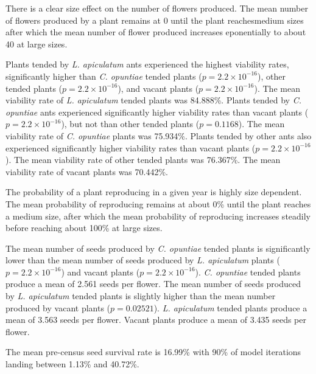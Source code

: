 \documentclass[11pt]{article}
\begin{document}
There is a clear size effect on the number of flowers produced. 
The mean number of flowers produced by a plant remains at 0 until the plant reachesmedium sizes after which the mean number of flower produced increases eponentially to about 40 at large sizes.


Plants tended by \textit{L. apiculatum} ants experienced the highest viability rates, significantly higher than \textit{C. opuntiae} tended plants ($p = 2.2 \times 10^{-16}$), other tended plants ($p = 2.2 \times 10^{-16}$), and vacant plants ($p = 2.2 \times 10^{-16}$).
The mean viability rate of \textit{L. apiculatum} tended plants was 84.888\%.
Plants tended by \textit{C. opuntiae} ants experienced significantly higher viability rates than vacant plants ($p = 2.2 \times 10^{-16}$), but not than other tended plants ($p = 0.1168$).
The mean viability rate of \textit{C. opuntiae} plants was 75.934\%.
Plants tended by other ants also experienced significantly higher viability rates than vacant plants ($p = 2.2 \times 10^{-16}$).
The mean viability rate of other tended plants was 76.367\%.
The mean viability rate of vacant plants was 70.442\%.

The probability of a plant reproducing in a given year is highly size dependent. 
The mean probability of reproducing remains at about 0\% until the plant reaches a medium size, after which the mean probability of reproducing increases steadily before reaching about 100\% at large sizes. 

The mean number of seeds produced by \textit{C. opuntiae} tended plants is significantly lower than the mean number of seeds produced by \textit{L. apiculatum} plants ($p = 2.2 \times 10^{-16}$) and vacant plants ($p = 2.2 \times 10^{-16}$). 
\textit{C. opuntiae} tended plants produce a mean of 2.561 seeds per flower. 
The mean number of seeds produced by \textit{L. apiculatum} tended plants is slightly higher than the mean number produced by vacant plants ($p = 0.02521$). 
\textit{L. apiculatum} tended plants produce a mean of 3.563 seeds per flower. 
Vacant plants produce a mean of 3.435 seeds per flower. 

The mean pre-census seed survival rate is 16.99\% with 90\% of model iterations landing between 1.13\% and 40.72\%. 
\end{document}
